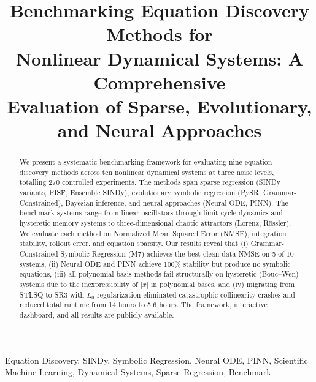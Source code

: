 \documentclass[conference]{IEEEtran}
\begin{document}
\title{Benchmarking Equation Discovery Methods for\\Nonlinear Dynamical Systems: A Comprehensive\\Evaluation of Sparse, Evolutionary, and Neural Approaches}

\author{
}

\maketitle

\begin{abstract}
We present a systematic benchmarking framework for evaluating nine equation discovery methods across ten nonlinear dynamical systems at three noise levels, totalling 270 controlled experiments. The methods span sparse regression (SINDy variants, PISF, Ensemble SINDy), evolutionary symbolic regression (PySR, Grammar-Constrained), Bayesian inference, and neural approaches (Neural ODE, PINN). The benchmark systems range from linear oscillators through limit-cycle dynamics and hysteretic memory systems to three-dimensional chaotic attractors (Lorenz, R\"{o}ssler). We evaluate each method on Normalized Mean Squared Error (NMSE), integration stability, rollout error, and equation sparsity. Our results reveal that (i) Grammar-Constrained Symbolic Regression (M7) achieves the best clean-data NMSE on 5 of 10 systems, (ii) Neural ODE and PINN achieve 100\% stability but produce no symbolic equations, (iii) all polynomial-basis methods fail structurally on hysteretic (Bouc--Wen) systems due to the inexpressibility of $|x|$ in polynomial bases, and (iv) migrating from STLSQ to SR3 with $L_0$ regularization eliminated catastrophic collinearity crashes and reduced total runtime from 14 hours to 5.6 hours. The framework, interactive dashboard, and all results are publicly available.
\end{abstract}

\begin{IEEEkeywords}
Equation Discovery, SINDy, Symbolic Regression, Neural ODE, PINN, Scientific Machine Learning, Dynamical Systems, Sparse Regression, Benchmark
\end{IEEEkeywords}










\end{document}

